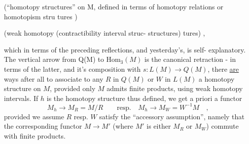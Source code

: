 
\hand{\}} (``homotopy structures'' on M,
defined in terms of homotopy
 relations\hand{,} or homotopism stru
tures )

(weak homotopy \hand{|} (contractibility
interval struc- \hand{|} structures)
tures) \hand{|}
,

which in terms of the preceding reflections, and yesterday's, is self-%
explanatory. The vertical arrow from Q(M) to $\mathrm{Hom}_3(M)$ is the canonical
retraction - in terms of the latter, and it's composition with
$s\colon L(M)\to Q(M)$, there \uline{are} ways after all to associate to any $R$ in $Q(M)$
or $W$ in $L(M)$ a homotopy structure on $M$, provided only $M$ admits finite
products,  using weak homotopy intervals. If $h$ is the homotopy structure
thus defined, we get a priori a functor
\[ M_h \to M_R = M/R \qquad \text{resp.} \quad M_h \to M_W = W^{-1}M \quad , \]
\margin{$\times$} provided we assume $R$ resp. $W$ satisfy the ``accessory assumption'', namely
that the corresponding functor $M\to M'$ (where $M'$ is either $M_R$ or $M_W$)
commute with finite products.

